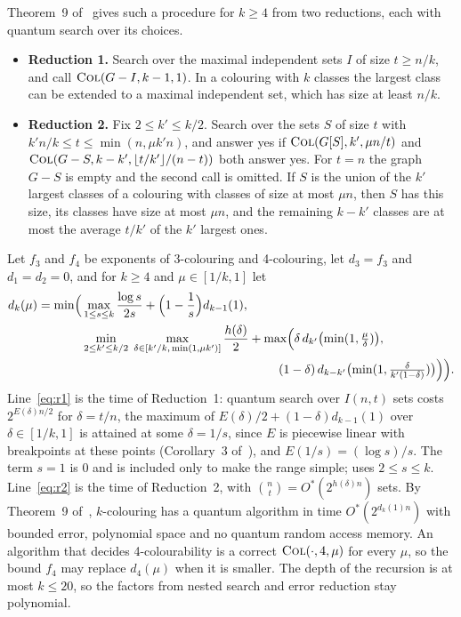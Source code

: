 \documentclass[11pt]{article}
\theoremstyle{remark}
\newcommand{\COL}{\textup{\textsc{Col}}}
\begin{document}
Theorem~9 of~\cite{SM22} gives such a procedure for $k \ge 4$ from two reductions, each with quantum search over its choices.
\begin{itemize}
\item \textbf{Reduction 1.} Search over the maximal independent sets $I$ of size $t \ge n/k$, and call $\COL(G - I, k - 1, 1)$. In a colouring with $k$ classes the largest class can be extended to a maximal independent set, which has size at least $n/k$.
\item \textbf{Reduction 2.} Fix $2 \le k' \le k/2$. Search over the sets $S$ of size $t$ with $k'n/k \le t \le \min(n, \mu k' n)$, and answer yes if $\COL(G[S], k', \mu n/t)$ and $\COL(G - S, k - k', \lfloor t/k' \rfloor/(n - t))$ both answer yes. For $t = n$ the graph $G - S$ is empty and the second call is omitted. If $S$ is the union of the $k'$ largest classes of a colouring with classes of size at most $\mu n$, then $S$ has this size, its classes have size at most $\mu n$, and the remaining $k - k'$ classes are at most the average $t/k'$ of the $k'$ largest ones.
\end{itemize}
Let $f_3$ and $f_4$ be exponents of 3-colouring and 4-colouring, let $d_3 = f_3$ and $d_1 = d_2 = 0$, and for $k \ge 4$ and $\mu \in [1/k, 1]$ let
\begin{align}
d_k(\mu) = \min\Bigl(&\max_{1 \le s \le k} \frac{\log s}{2s} + \Bigl(1 - \frac1s\Bigr) d_{k-1}(1),\label{eq:r1}\\
&\min_{2 \le k' \le k/2}\; \max_{\delta \in [k'/k,\, \min(1, \mu k')]} \frac{h(\delta)}{2} + \max\Bigl(\delta\, d_{k'}\bigl(\min(1, \tfrac{\mu}{\delta})\bigr),\label{eq:r2}\\
&\hspace{16em} (1-\delta)\, d_{k-k'}\bigl(\min(1, \tfrac{\delta}{k'(1-\delta)})\bigr)\Bigr)\Bigr).\notag
\end{align}
Line~\eqref{eq:r1} is the time of Reduction~1: quantum search over $I(n,t)$ sets costs $2^{E(\delta)n/2}$ for $\delta = t/n$, the maximum of $E(\delta)/2 + (1-\delta)d_{k-1}(1)$ over $\delta \in [1/k, 1]$ is attained at some $\delta = 1/s$, since $E$ is piecewise linear with breakpoints at these points (Corollary~3 of~\cite{SM22}), and $E(1/s) = (\log s)/s$. The term $s = 1$ is $0$ and is included only to make the range simple; \cite{SM22} uses $2 \le s \le k$. Line~\eqref{eq:r2} is the time of Reduction~2, with $\binom{n}{t} = O^*(2^{h(\delta)n})$ sets. By Theorem~9 of~\cite{SM22}, $k$-colouring has a quantum algorithm in time $O^*(2^{d_k(1)n})$ with bounded error, polynomial space and no quantum random access memory. An algorithm that decides 4-colourability is a correct $\COL(\cdot, 4, \mu)$ for every $\mu$, so the bound $f_4$ may replace $d_4(\mu)$ when it is smaller. The depth of the recursion is at most $k \le 20$, so the factors from nested search and error reduction stay polynomial.
\end{document}
